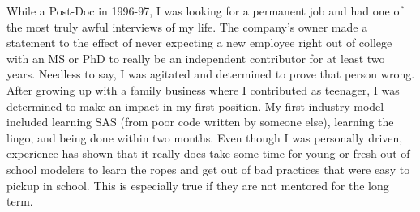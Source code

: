 \documentclass[10pt]{article}
\begin{document}
While a Post-Doc in 1996-97, I was looking for a permanent job and had one of the most truly awful interviews of my life.  The company's
owner made a statement to the effect of never expecting a new employee right out of college with an MS or PhD to really be an independent
contributor for at least two years.  Needless to say, I was agitated and determined to prove that person wrong.  After growing up with a family
business where I contributed as teenager, I was determined to make an impact in my first position.  My first industry model included
learning SAS (from poor code written by someone else), learning the lingo, and being done within two months.
Even though I was personally driven, experience has shown that it really does take some time for young or 
fresh-out-of-school modelers to learn the ropes and get out of bad practices that 
were easy to pickup in school.  This is especially true if they are not mentored for the long term.
\end{document}
